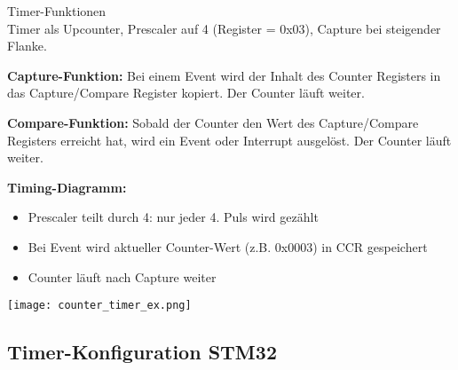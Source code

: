 \begin{example2}{Timer-Funktionen}\\
    Timer als Upcounter, Prescaler auf 4 (Register = 0x03), Capture bei steigender Flanke.
    
    \tcblower
    
    \textbf{Capture-Funktion:}
    Bei einem Event wird der Inhalt des Counter Registers in das Capture/Compare Register kopiert. Der Counter läuft weiter.
    
    \textbf{Compare-Funktion:}
    Sobald der Counter den Wert des Capture/Compare Registers erreicht hat, wird ein Event oder Interrupt ausgelöst. Der Counter läuft weiter.
    
    \textbf{Timing-Diagramm:}
    \begin{itemize}
        \item Prescaler teilt durch 4: nur jeder 4. Puls wird gezählt
        \item Bei Event wird aktueller Counter-Wert (z.B. 0x0003) in CCR gespeichert
        \item Counter läuft nach Capture weiter
    \end{itemize}
    \texttt{[image: counter\_timer\_ex.png]}
\end{example2}

\subsection{Timer-Konfiguration STM32}

